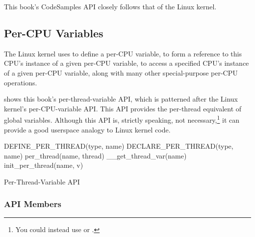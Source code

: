 This book's CodeSamples API closely follows that of the Linux kernel.

\subsection{Per-CPU Variables}
\label{sec:toolsoftrade:Per-CPU Variables}

The Linux kernel uses  to define a per-CPU variable,
 to form a reference to this CPU's instance of a
given per-CPU variable,  to access a specified CPU's
instance of a given per-CPU variable, along with many other special-purpose
per-CPU operations.

shows this book's per-thread-variable API, which is patterned
after the Linux kernel's per-CPU-variable API\@.
This API provides the per-thread equivalent of global variables.
Although this API is, strictly speaking, not necessary,\footnote{
	You could instead use  or .}
it can provide a good userspace analogy to Linux kernel code.

\begin{listing}
\begin{VerbatimL}[numbers=none]
DEFINE_PER_THREAD(type, name)
DECLARE_PER_THREAD(type, name)
per_thread(name, thread)
__get_thread_var(name)
init_per_thread(name, v)
\end{VerbatimL}
\caption{Per-Thread-Variable API}
\label{lst:toolsoftrade:Per-Thread-Variable API}
\end{listing}

\QuickQuizEnd

\subsubsection{API Members}

